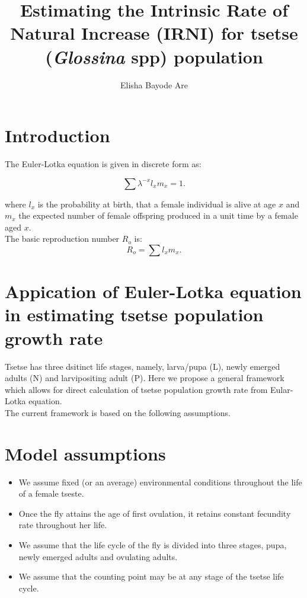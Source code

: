 \documentclass[10pt,a4paper]{article}
\author{Elisha Bayode Are}
\title{Estimating the Intrinsic Rate of Natural Increase (IRNI) for tsetse ({\it Glossina} spp) population}
\begin{document}
\maketitle

\section*{Introduction} 

The Euler-Lotka  equation is given in discrete form as: 

\begin{equation}
\label{equation3}
\sum \lambda^{-x}l_{x}m_{x} = 1.
\end{equation}

where  $l_{x}$ is the probability at birth, that a female individual is alive at age $x$ and $m_{x}$ the expected number of female offspring produced in a unit time by a female aged $x$.  \\ 

The basic reproduction number $R_{o}$ is:
\begin{equation}
\label{equation4}
R_{o}= \sum l_{x}m_{x}. 
\end{equation}



\section*{Appication of Euler-Lotka  equation in estimating tsetse population growth rate}

Tsetse has three dsitinct life stages, namely, larva/pupa (L), newly emerged adults (N) and larvipositing adult (P). 
Here we propose a general framework which allows for direct calculation of tsetse population growth rate from  Eular-Lotka equation.  \\
The current framework is based on the following assumptions.  
\section*{Model assumptions} 

\begin{itemize}
	\item  We assume fixed (or an average) environmental conditions throughout the life of a female tseste. 
	\item  Once the fly attains the age of first ovulation, it retains constant fecundity rate throughout her life.   
	\item We assume that the life cycle of the fly is divided into three stages, pupa, newly emerged adults and ovulating adults.  
    \item We assume that the counting point may be at any stage of the tsetse life cycle.
\end{itemize}
\end{document}
